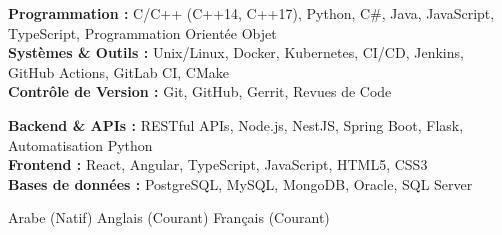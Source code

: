 \documentclass[11pt,a4paper]{article}
\begin{document}
{\small
\begin{minipage}[t]{0.48\textwidth}
  \textbf{Programmation :} C/C++ (C++14, C++17), Python, C\#, Java, JavaScript, TypeScript, Programmation Orientée Objet\\[1.5pt]
  \textbf{Systèmes \& Outils :} Unix/Linux, Docker, Kubernetes, CI/CD, Jenkins, GitHub Actions, GitLab CI, CMake\\[1.5pt]
  \textbf{Contrôle de Version :} Git, GitHub, Gerrit, Revues de Code
\end{minipage}
\hfill
\begin{minipage}[t]{0.48\textwidth}
  \textbf{Backend \& APIs :} RESTful APIs, Node.js, NestJS, Spring Boot, Flask, Automatisation Python\\[1.5pt]
  \textbf{Frontend :} React, Angular, TypeScript, JavaScript, HTML5, CSS3\\[1.5pt]
  \textbf{Bases de données :} PostgreSQL, MySQL, MongoDB, Oracle, SQL Server
\end{minipage}
}

Arabe (Natif) \textbar{} Anglais (Courant) \textbar{} Français (Courant)

\end{document}
